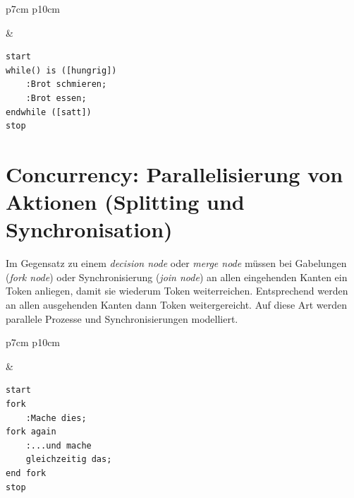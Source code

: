 \documentclass[10pt]{scrartcl}
\begin{document}
\begin{tabular}[b]{p{7cm} p{10cm}}
	
	&
	
	\begin{lstlisting}[style=plantuml]
start
while() is ([hungrig])
	:Brot schmieren;
	:Brot essen;
endwhile ([satt])
stop

	\end{lstlisting}
\end{tabular}
\newpage
\section{Concurrency: Parallelisierung von Aktionen (Splitting und Synchronisation)}
Im Gegensatz zu einem \textit{decision node} oder \textit{merge node} müssen bei Gabelungen (\textit{fork node}) oder Synchronisierung (\textit{join node}) an allen eingehenden Kanten ein Token anliegen, damit sie wiederum Token weiterreichen. Entsprechend werden an allen ausgehenden Kanten dann Token weitergereicht. Auf diese Art werden parallele Prozesse und Synchronisierungen modelliert.

\begin{tabular}[b]{p{7cm} p{10cm}}
	
	&
	
	\begin{lstlisting}[style=plantuml]
start
fork
	:Mache dies;
fork again
	:...und mache 
	gleichzeitig das;
end fork
stop

	
	\end{lstlisting}
\end{tabular}
\end{document}
